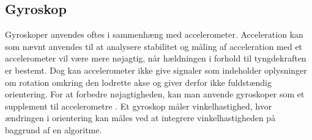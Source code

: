 \subsection{Gyroskop}

Gyroskoper anvendes oftes i sammenhæng med accelerometer. Acceleration kan som nævnt anvendes til at analysere stabilitet og måling af acceleration med et accelerometer vil være mere nøjagtig, når hældningen i forhold til tyngdekraften er bestemt.
Dog kan accelerometer ikke give signaler som indeholder oplysninger om rotation omkring den lodrette akse og giver derfor ikke fuldstændig  orientering.
For at forbedre nøjagtigheden, kan man anvende gyroskoper som et supplement til accelerometre .
Et gyroskop måler vinkelhastighed, hvor ændringen i orientering kan måles ved at integrere vinkelhastigheden på baggrund af en algoritme.